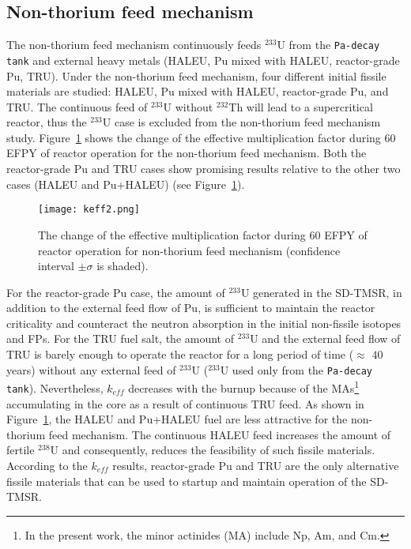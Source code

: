\subsection{Non-thorium feed mechanism}

The non-thorium feed mechanism continuously feeds 
$^{233}$U from the \texttt{Pa-decay tank} and external heavy metals (\gls{HALEU}, Pu mixed with \gls{HALEU}, reactor-grade Pu, \gls{TRU}).
Under the non-thorium feed mechanism, four different initial fissile materials are studied: \gls{HALEU}, Pu mixed with \gls{HALEU}, reactor-grade Pu, and \gls{TRU}. The continuous feed of $^{233}$U 
without $^{232}$Th will lead to a supercritical reactor, thus the $^{233}$U case 
is excluded from the non-thorium feed mechanism study.
Figure~\ref{fig:keff2} shows the change of the effective multiplication factor 
during 60 \gls{EFPY} of reactor operation for the non-thorium feed mechanism. Both the reactor-grade Pu and TRU cases 
show promising results relative to the other two cases (HALEU and Pu+HALEU) (see Figure~\ref{fig:keff2}). 
\begin{figure}
	\centering
	\texttt{[image: keff2.png]}
			\vspace{-0.5in}
	\caption{The change of the effective multiplication factor during 60 
	\gls{EFPY} of reactor operation for non-thorium feed mechanism (confidence 
	interval $\pm\sigma$ is shaded).} 
	\label{fig:keff2}
\end{figure}
For the reactor-grade Pu case, the amount of $^{233}$U generated in the \gls{SD-TMSR}, in addition to the external feed flow of Pu, is sufficient to maintain the reactor criticality and counteract the neutron absorption in the initial non-fissile isotopes and FPs. 
For the \gls{TRU} fuel salt, the amount of 
$^{233}$U and the external feed flow of TRU is barely enough to operate the 
reactor for a long period of time ($\approx$ $40$ years) without any 
external feed of $^{233}$U ($^{233}$U used only from the \texttt{Pa-decay tank}). Nevertheless, $k_{eff}$ decreases with the burnup 
because of the \glspl{MA}\footnote{In the present work, the minor actinides 
(MA) include Np, Am, and Cm.} accumulating in the core as a result of 
continuous TRU feed. As shown in Figure~\ref{fig:keff2}, the HALEU and Pu+HALEU 
fuel are less attractive for the non-thorium feed mechanism. The continuous HALEU 
feed increases the amount of fertile $^{238}$U and consequently, reduces the 
feasibility of such fissile materials. According to the $k_{eff}$ 
results, reactor-grade Pu and TRU are the only alternative fissile materials that  
can be used to startup and maintain operation of the \gls{SD-TMSR}.

